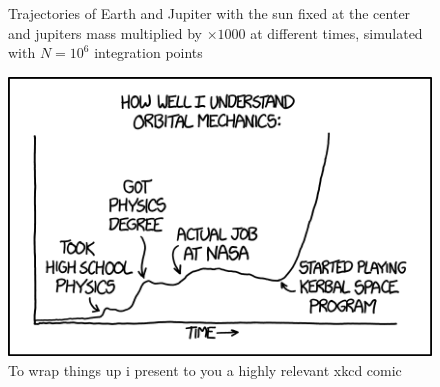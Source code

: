 \documentclass[10pt,showpacs,preprintnumbers,amsmath,amssymb,nofootinbib,aps,prl,twocolumn,groupedaddress,superscriptaddress,showkeys]{revtex4-1}
\begin{document}
\begin{figure}
    \caption{Trajectories of Earth and Jupiter with the sun fixed at the center and jupiters mass multiplied by $\times 1000$ at different times, simulated with $N=10^6$ integration points}
    \label{fig:ex_e earth slingshot}
  \end{figure}


\begin{figure}[h!]
  \center
  \includegraphics[scale=0.5]{figs/orbital_mechanics.png}
  \caption{To wrap things up i present to you a highly relevant xkcd comic}
\end{figure}
\end{document}

